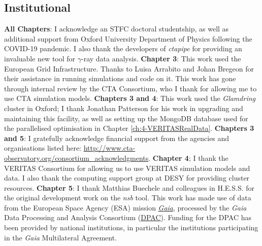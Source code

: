 \newpage

\subsection*{Institutional}
\textbf{All Chapters}: I acknowledge an STFC doctoral studentship, as well as additional support from Oxford University Department of Physics following the COVID-19 pandemic. I also thank the developers of \textit{ctapipe} for providing an invaluable new tool for $\gamma$-ray data analysis. \newline
\textbf{Chapter 3}: This work used the European Grid Infrastructure. Thanks to Luisa Arrabito and Johan Bregeon for their assistance in running simulations and code on it. This work has gone through internal review by the CTA Consortium, who I thank for allowing me to use CTA simulation models. 
\newline
\textbf{Chapters 3 and 4}: This work used the \textit{Glamdring} cluster in Oxford; I thank Jonathan Patterson for his work in upgrading and maintaining this facility, as well as setting up the MongoDB database used for the parallelised optimisation in Chapter \ref{ch:4-VERITASRealData}. 
\newline\textbf{Chapters 3 and 5}:
I gratefully acknowledge financial support from the agencies and organisations listed here: \url{http://www.cta-observatory.org/consortium\_acknowledgments}.
\newline
\textbf{Chapter 4}; I thank the VERITAS Consortium for allowing us to use VERITAS simulation models and data. I also thank the computing support group at DESY for providing cluster resources. \newline
\textbf{Chapter 5}: I thank Matthias Buechele and colleagues in H.E.S.S. for the original development work on the \textit{nsb} tool. This work has made use of data from the European Space Agency (ESA) mission \href{https://www.cosmos.esa.int/gaia}{\textit{Gaia}}, processed by the \textit{Gaia} Data Processing and Analysis Consortium (\href{https://www.cosmos.esa.int/web/gaia/dpac/consortium}{DPAC}). Funding for the DPAC has been provided by national institutions, in particular the institutions participating in the \textit{Gaia} Multilateral Agreement.
